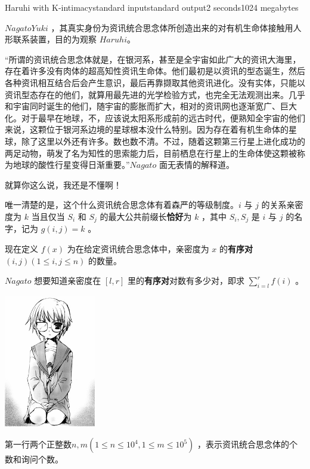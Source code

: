 \begin{problem}{Haruhi with K-intimacy}{standard input}{standard output}{2 seconds}{1024 megabytes}

$Nagato Yuki$ ，其真实身份为资讯统合思念体所创造出来的对有机生命体接触用人形联系装置，目的为观察 $Haruhi$。

“所谓的资讯统合思念体就是，在银河系，甚至是全宇宙如此广大的资讯大海里，存在着许多没有肉体的超高知性资讯生命体。他们最初是以资讯的型态诞生，然后各种资讯相互结合后会产生意识，最后再靠撷取其他资讯进化。没有实体，只能以资讯型态存在的他们，就算用最先进的光学检验方式，也完全无法观测出来。几乎和宇宙同时诞生的他们，随宇宙的膨胀而扩大，相对的资讯网也逐渐宽广、巨大化。对于最早在地球，不，应该说太阳系形成前的远古时代，便熟知全宇宙的他们来说，这颗位于银河系边境的星球根本没什么特别。因为存在着有机生命体的星球，除了这里以外还有许多。数也数不清。不过，随着这颗第三行星上进化成功的两足动物，萌发了名为知性的思索能力后，目前栖息在行星上的生命体使这颗被称为地球的酸性行星变得日渐重要。”$Nagato$ 面无表情的解释道。

就算你这么说，我还是不懂啊！

唯一清楚的是，这个什么资讯统合思念体有着森严的等级制度。$i$ 与 $j$ 的关系亲密度为 $k$ 当且仅当 $S_i$ 和 $S_j$ 的最大公共前缀长\textbf{恰好}为 $k$ ，其中 $S_i,S_j$ 是 $i$ 与 $j$ 的名字，记为 $g(i,j)=k$ 。 

现在定义 $f(x)$ 为在给定资讯统合思念体中，亲密度为 $x$ 的\textbf{有序对} $(i,j)(1 \leq i,j \leq n)$ 的数量。

$Nagato$ 想要知道亲密度在 $[l,r]$ 里的\textbf{有序对}对数有多少对，即求 $\sum_{i=l}^r f(i)$ 。

\begin{center}
\includegraphics[width=0.3\textwidth]{pics/K.jpg}
\end{center}

\InputFile

第一行两个正整数$n,m(1 \leq n \leq 10^4,1 \leq m \leq 10^5)$ ，表示资讯统合思念体的个数和询问个数。


\end{problem}
